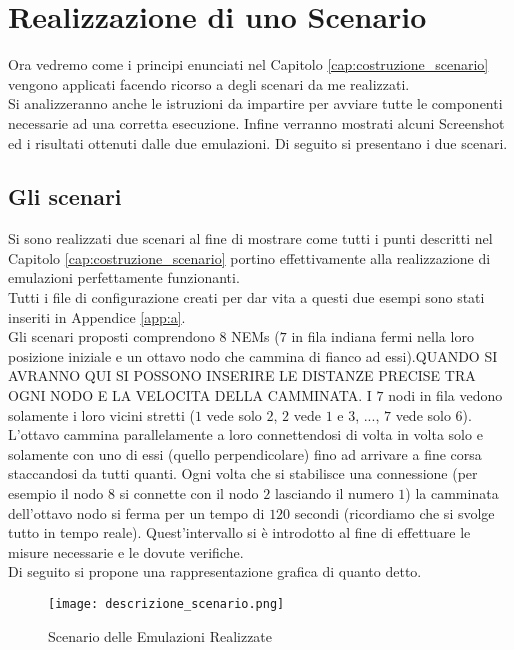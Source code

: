 \chapter{Realizzazione di uno Scenario}

Ora vedremo come i principi enunciati nel Capitolo \ref{cap:costruzione_scenario} vengono applicati facendo ricorso a degli scenari da me realizzati. \\
Si analizzeranno anche le istruzioni da impartire per avviare tutte le componenti necessarie ad una corretta esecuzione. Infine verranno mostrati alcuni Screenshot ed i risultati ottenuti dalle due emulazioni. Di seguito si presentano i due scenari.

\section{Gli scenari}

Si sono realizzati due scenari al fine di mostrare come tutti i punti descritti nel Capitolo \ref{cap:costruzione_scenario} portino effettivamente alla realizzazione di emulazioni perfettamente funzionanti. \\
Tutti i file di configurazione creati per dar vita a questi due esempi sono stati inseriti in Appendice \ref{app:a}. \\
Gli scenari proposti comprendono $8$ NEMs ($7$ in fila indiana fermi nella loro posizione iniziale e un ottavo nodo che cammina di fianco ad essi).QUANDO SI AVRANNO QUI SI POSSONO INSERIRE LE DISTANZE PRECISE TRA OGNI NODO E LA VELOCITA DELLA CAMMINATA. I $7$ nodi in fila vedono solamente i loro vicini stretti ($1$ vede solo $2$, $2$ vede $1$ e $3$, ..., $7$ vede solo $6$). L'ottavo cammina parallelamente a loro connettendosi di volta in volta solo e solamente con uno di essi (quello perpendicolare) fino ad arrivare a fine corsa staccandosi da tutti quanti. Ogni volta che si stabilisce una connessione (per esempio il nodo $8$ si connette con il nodo $2$ lasciando il numero $1$) la camminata dell'ottavo nodo si ferma per un tempo di $120$ secondi (ricordiamo che si svolge tutto in tempo reale). Quest'intervallo si è introdotto al fine di effettuare le misure necessarie e le dovute verifiche. \\
Di seguito si propone una rappresentazione grafica di quanto detto.

\begin{figure}[H]
	\centering
	\texttt{[image: descrizione\_scenario.png]}
	\caption{Scenario delle Emulazioni Realizzate}
	\label{fig:descrizione_scenario}
\end{figure}

